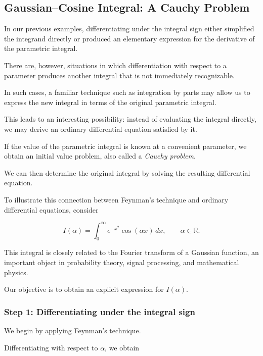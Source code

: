 \documentclass[11pt,a4paper]{article}
\theoremstyle{definition}
\theoremstyle{remark}
\begin{document}
\subsection{Gaussian--Cosine Integral:
A Cauchy Problem}

In our previous examples, differentiating
under the integral sign either simplified
the integrand directly or produced an
elementary expression for the derivative
of the parametric integral.

There are, however, situations in which
differentiation with respect to a parameter
produces another integral that is not
immediately recognizable.

In such cases, a familiar technique
such as integration by parts may allow
us to express the new integral in terms
of the original parametric integral.

This leads to an interesting possibility:
instead of evaluating the integral
directly, we may derive an ordinary
differential equation satisfied by it.

If the value of the parametric integral
is known at a convenient parameter,
we obtain an initial value problem,
also called a \emph{Cauchy problem}.

We can then determine the original
integral by solving the resulting
differential equation.

To illustrate this connection between
Feynman's technique and ordinary
differential equations, consider

\begin{equation}
    I(\alpha)
    =
    \int_0^\infty
    e^{-x^2}\cos(\alpha x)\,dx,
    \qquad \alpha\in\mathbb{R}.
    \label{eq:cauchy_integral_def}
\end{equation}

This integral is closely related
to the Fourier transform of a
Gaussian function, an important
object in probability theory,
signal processing, and mathematical
physics.

Our objective is to obtain an
explicit expression for $I(\alpha)$.

\subsubsection*{Step 1: Differentiating
under the integral sign}

We begin by applying Feynman's
technique.

Differentiating with respect
to $\alpha$, we obtain
\end{document}
